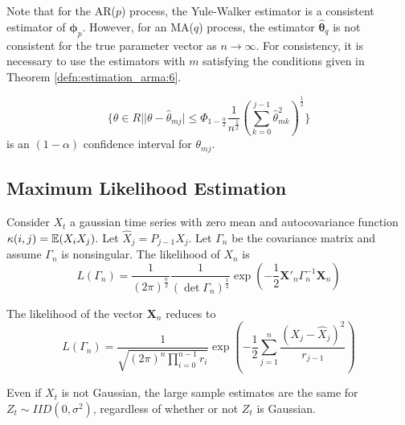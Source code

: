 \begin{remark}
  Note that for the AR($p$) process, the Yule-Walker estimator is a
  consistent estimator of $\mathbf{\phi}_{p}$. However, for an MA($q$)
  process, the estimator $\hat{\mathbf{\theta}}_{q}$ is not consistent
  for the true parameter vector as $n \rightarrow \infty$.  For
  consistency, it is necessary to use the estimators with $m$
  satisfying the conditions given in Theorem
  \ref{defn:estimation_arma:6}.
\end{remark}

\begin{thm}
  \label{defn:estimation_arma:7}
  \begin{equation}
    \label{eq:58}
    \{ \theta \in R | |\theta - \hat \theta_{mj}| \leq \Phi_{1 -
      \frac{\alpha}{2}} \frac{1}{n^{\frac{1}{2}}}
    (\sum_{k=0}^{j-1}\hat \theta_{mk}^{2})^{\frac{1}{2}} \}
  \end{equation} is an $(1 - \alpha)$ confidence interval for $\theta_{mj}$.
\end{thm}

\subsection{Maximum Likelihood Estimation}
\label{sec:maxim-likel-estim}

Consider $X_{t}$ a gaussian time series with zero mean and
autocovariance function $\kappa(i, j) = \E{X_{i} X_{j}}$.  Let $\hat
X_{j} = P_{j-1} X_{j}$.  Let $\Gamma_{n}$ be the covariance matrix and
assume $\Gamma_{n}$ is nonsingular.  The likelihood of $X_{n}$ is
\begin{equation}
  \label{eq:59}
  L(\Gamma_{n}) = \frac{1}{(2 \pi)^{\frac{n}{2}}} \frac{1}{(\det
    \Gamma_{n})^{\frac{1}{2}}} \exp(-\frac{1}{2} \mathbf{X}'_{n}
  \Gamma_{n}^{-1} \mathbf{X}_{n})
\end{equation}

\begin{thm}
  \label{defn:estimation_arma:8}
  The likelihood of the vector $\mathbf{X}_{n}$ reduces to
  \begin{equation}
    \label{eq:60}
    L(\Gamma_{n}) = \frac{1}{\sqrt{(2\pi)^{n} \prod_{i=0}^{n-1}
        r_{i}}} \exp(-\frac{1}{2} \sum_{j=1}^{n} \frac{(X_{j} - \hat X_{j})^{2}}{r_{j-1}})
  \end{equation}
\end{thm}

\begin{remark}
  Even if $X_{t}$ is not Gaussian, the large sample estimates are the
  same for $Z_{t} \sim IID(0, \sigma^{2})$, regardless of whether or
  not $Z_{t}$ is Gaussian.
\end{remark}

